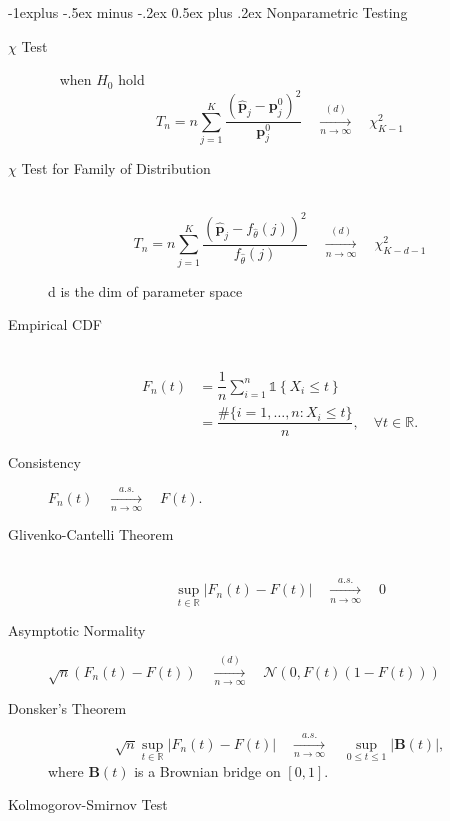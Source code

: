 \documentclass[a4paper, 10pt,landscape]{article}
\makeatletter
\renewcommand{\subsection}{\@startsection{subsection}{2}{0mm}%
                                {-1explus -.5ex minus -.2ex}%
                                {0.5ex plus .2ex}%
                                {\normalfont\normalsize\bfseries}}
\makeatother
\begin{document}
\begin{multicols*}{4}
\subsection{Nonparametric Testing}
	\begin{description}
		\item[$\chi$ Test]~
			when $H_0$ hold $$T_n=n\sum_{j=1}^{K}\dfrac{\left(\widehat{\mathbf{p}}_j-\mathbf{p}_j^0\right)^2}{\mathbf{p}_j^0}\quad\xrightarrow[n\rightarrow\infty]{(d)}\quad\chi_{K-1}^2$$
		\item[$\chi$ Test for Family of Distribution]~
			$$T_n=n\sum_{j=1}^{K}\dfrac{\left(\widehat{\mathbf{p}}_j- f_{\widehat{\theta}}(j) \right)^2}{f_{\widehat{\theta}}(j)}\quad\xrightarrow[n\rightarrow\infty]{(d)}\quad\chi_{K-d-1}^2$$
			
			d is the dim of parameter space
		\item[Empirical CDF]~
			\begin{align*}
				F_n(t)&=\dfrac{1}{n}\sum_{i=1}^{n}\mathds{1}\left\{X_i\leq t\right\}\\
				&=\dfrac{\#\{i=1,\dots,n:X_i\leq t\}}{n},\quad\forall t\in\mathbb{R}.
			\end{align*}
		\item[Consistency] $F_n(t)\quad\xrightarrow[n\rightarrow\infty]{a.s.}\quad F(t).$
		\item[Glivenko-Cantelli Theorem] ~ $$\sup\limits_{t\in\mathbb{R}}\left|F_n(t)-F(t)\right|\quad\xrightarrow[n\rightarrow\infty]{a.s.}\quad0$$
		\item[Asymptotic Normality] $\sqrt{n}\left(F_n(t)-F(t)\right)\quad\xrightarrow[n\rightarrow\infty]{(d)}\quad\mathcal{N}\left(0,F(t)\left(1-F(t)\right)\right)$
		\item[Donsker's Theorem] $$\sqrt{n}\sup\limits_{t\in\mathbb{R}}\left|F_n(t)-F(t)\right|\quad\xrightarrow[n\rightarrow\infty]{a.s.}\quad\sup\limits_{0\leq t\leq 1}\left|\mathbf{B}(t)\right|,$$
	where $\mathbf{B}(t)$ is a Brownian bridge on $[0,1]$. 
		\item[Kolmogorov-Smirnov Test]~
\end{description}
\end{multicols*}
\end{document}
